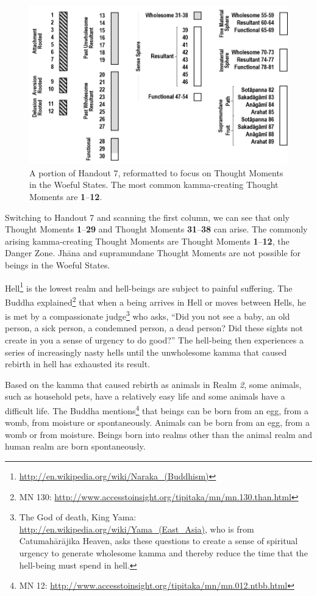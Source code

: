 \begin{figure}[h]
\centering
\includegraphics[width=0.7\linewidth]{./Diagrams/Woeful}
\caption{A portion of Handout 7, reformatted to focus on Thought Moments in the Woeful States. The most common kamma-creating Thought Moments are \textbf{1}--\textbf{12}.}
\label{fig:Woeful}
\end{figure}

Switching to Handout 7 and scanning the first column, we can see that only Thought Moments \textbf{1}--\textbf{29} and Thought Moments \textbf{31}--\textbf{38} can arise. The commonly arising kamma-creating Thought Moments are Thought Moments \textbf{1}--\textbf{12}, the Danger Zone. Jhāna and supramundane Thought Moments are not possible for beings in the Woeful States.

Hell\footnote{\url{http://en.wikipedia.org/wiki/Naraka_(Buddhism)}} is the lowest realm and hell-beings are subject to painful suffering. The Buddha explained\footnote{MN 130: \url{http://www.accesstoinsight.org/tipitaka/mn/mn.130.than.html}} that when a being arrives in Hell or moves between Hells, he is met by a compassionate judge\footnote{The God of death, King Yama: \url{http://en.wikipedia.org/wiki/Yama_(East_Asia)}, who is from Catumahārājika Heaven, asks these questions to create a sense of spiritual urgency to generate wholesome kamma and thereby reduce the time that the hell-being must spend in hell.} who asks, “Did you not see a baby, an old person, a sick person, a condemned person, a dead person? Did these sights not create in you a sense of urgency to do good?” The hell-being then experiences a series of increasingly nasty hells until the unwholesome kamma that caused rebirth in hell has exhausted its result.

Based on the kamma that caused rebirth as animals in Realm \textit{2}, some animals, such as household pets, have a relatively easy life and some animals have a difficult life. The Buddha mentions\footnote{MN 12: \url{http://www.accesstoinsight.org/tipitaka/mn/mn.012.ntbb.html}} that beings can be born from an egg, from a womb, from moisture or spontaneously. Animals can be born from an egg, from a womb or from moisture. Beings born into realms other than the animal realm and human realm are born spontaneously.

